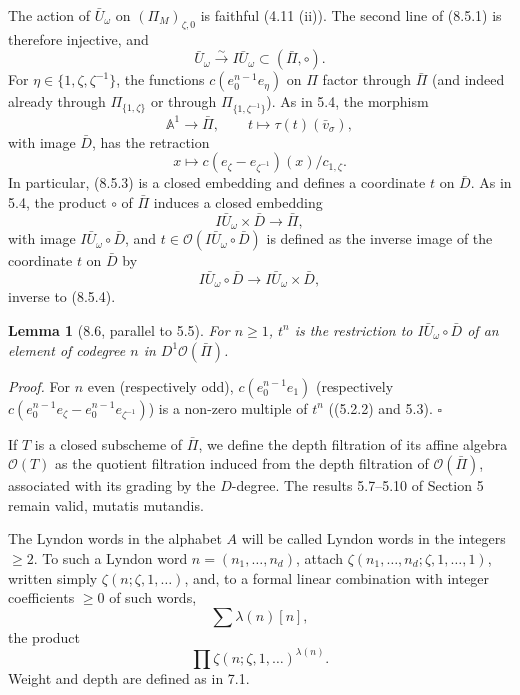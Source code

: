 \documentclass[10pt,a4paper]{article}
\newcommand{\A}{\mathbb A}
\newcommand{\OO}{\mathcal O}
\theoremstyle{deligne}
\newtheorem*{lemma*}{Lemma}
\newenvironment{proofdel}{\textit{Proof.}}{\hfill$\square$}
\newcommand{\heading}[1]{\vspace{0.65em}\noindent{\bfseries #1}\quad}
\begin{document}
The action of \(\bar U_\omega\) on \((\Pi_M)_{\zeta,0}\) is faithful (4.11 (ii)). The second line of (8.5.1) is therefore injective, and
\[
\tag{8.5.2}
\bar U_\omega\overset{\sim}{\longrightarrow}I\bar U_\omega\subset(\bar\Pi,\circ).
\]
For \(\eta\in\{1,\zeta,\zeta^{-1}\}\), the functions \(c(e_0^{n-1}e_\eta)\) on \(\Pi\) factor through \(\bar\Pi\) (and indeed already through \(\Pi_{\{1,\zeta\}}\) or through \(\Pi_{\{1,\zeta^{-1}\}}\)). As in 5.4, the morphism
\[
\tag{8.5.3}
\A^1\longrightarrow\bar\Pi,\qquad t\longmapsto\tau(t)(\bar v_\sigma),
\]
with image \(\bar D\), has the retraction
\[
x\longmapsto c(e_\zeta-e_{\zeta^{-1}})(x)/c_{1,\zeta}.
\]
In particular, (8.5.3) is a closed embedding and defines a coordinate \(t\) on \(\bar D\). As in 5.4, the product \(\circ\) of \(\bar\Pi\) induces a closed embedding
\[
\tag{8.5.4}
I\bar U_\omega\times\bar D\longrightarrow\bar\Pi,
\]
with image \(I\bar U_\omega\circ\bar D\), and \(t\in\OO(I\bar U_\omega\circ\bar D)\) is defined as the inverse image of the coordinate \(t\) on \(\bar D\) by
\[
\tag{8.5.5}
I\bar U_\omega\circ\bar D\longrightarrow I\bar U_\omega\times\bar D,
\]
inverse to (8.5.4).

\begin{lemma*}[8.6, parallel to 5.5]
For \(n\ge1\), \(t^n\) is the restriction to \(I\bar U_\omega\circ\bar D\) of an element of codegree \(n\) in \(D^1\OO(\bar\Pi)\).
\end{lemma*}

\begin{proofdel}
For \(n\) even (respectively odd), \(c(e_0^{n-1}e_1)\) (respectively \(c(e_0^{n-1}e_\zeta-e_0^{n-1}e_{\zeta^{-1}})\)) is a non-zero multiple of \(t^n\) ((5.2.2) and 5.3).
\end{proofdel}

\heading{8.7.} If \(T\) is a closed subscheme of \(\bar\Pi\), we define the depth filtration of its affine algebra \(\OO(T)\) as the quotient filtration induced from the depth filtration of \(\OO(\bar\Pi)\), associated with its grading by the \(D\)-degree. The results 5.7--5.10 of Section 5 remain valid, mutatis mutandis.

\heading{8.8.} The Lyndon words in the alphabet \(A\) will be called Lyndon words in the integers \(\ge2\). To such a Lyndon word \(n=(n_1,\ldots,n_d)\), attach \(\zeta(n_1,\ldots,n_d;\zeta,1,\ldots,1)\), written simply \(\zeta(n;\zeta,1,\ldots)\), and, to a formal linear combination with integer coefficients \(\ge0\) of such words,
\[
\sum\lambda(n)[n],
\]
the product
\[
\prod\zeta(n;\zeta,1,\ldots)^{\lambda(n)}.
\]
Weight and depth are defined as in 7.1.
\end{document}
